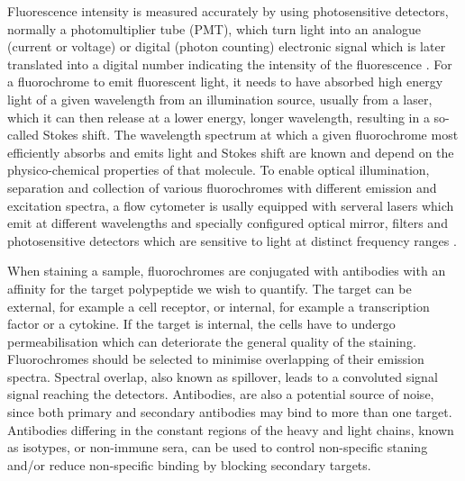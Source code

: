 Fluorescence intensity is measured accurately by using photosensitive detectors, normally a photomultiplier tube (PMT), which turn light into an analogue (current or voltage)
or digital (photon counting) electronic signal which is later translated into a digital number indicating the intensity of the fluorescence \citep{Shapiro:2003vq,Snow:2004ci}.
For a fluorochrome to emit fluorescent light, it needs to have absorbed high energy light of a given wavelength from an illumination source, usually from a laser, which it can then release at a lower energy, longer wavelength, resulting in a so-called Stokes shift.
The wavelength spectrum at which a given fluorochrome most efficiently absorbs and emits light and Stokes shift are known and depend on the physico-chemical properties of that molecule.
To enable optical illumination, separation and collection of various fluorochromes with different emission and excitation spectra, a flow cytometer is usally equipped with serveral lasers which emit at different wavelengths and specially configured optical mirror, filters and photosensitive detectors which are sensitive to light at distinct frequency ranges \citep{Shapiro:2003vq}.


When staining a sample, fluorochromes are conjugated with antibodies with an affinity for the target polypeptide we wish to quantify.
The target can be external, for example a cell receptor, or internal, for example a transcription factor or a cytokine.
If the target is internal, the cells have to undergo permeabilisation which can deteriorate the general quality of the staining.
Fluorochromes should be selected to minimise overlapping of their emission spectra.  Spectral overlap, also known as spillover, leads to a convoluted signal
signal reaching the detectors.
Antibodies, are also a potential source of noise, since both primary and secondary antibodies may bind to more than one target.
Antibodies differing in the constant regions of the heavy and light chains, known as isotypes, or non-immune sera, can be used to control non-specific staning and/or reduce non-specific binding by blocking secondary targets.


